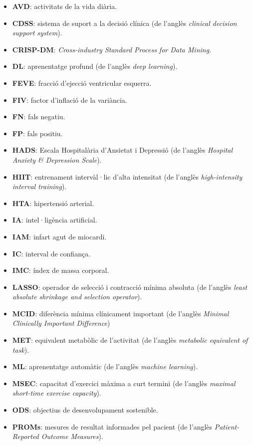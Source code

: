 \documentclass[CAT]{TFUOC}%
\providecommand{\tightlist}{\setlength{\itemsep}{0pt}\setlength{\parskip}{0pt}}
\begin{document}
\begin{itemize}
\tightlist
\item
  \textbf{AVD}: activitats de la vida diària.
\item
  \textbf{CDSS}: sistema de suport a la decisió clínica (de l'anglès \emph{clinical decision support system}).
\item
  \textbf{CRISP-DM}: \emph{Cross-industry Standard Process for Data Mining}.
\item
  \textbf{DL}: aprenentatge profund (de l'anglès \emph{deep learning}).
\item
  \textbf{FEVE}: fracció d'ejecció ventricular esquerra.
\item
  \textbf{FIV}: factor d'inflació de la variància.
\item
  \textbf{FN}: fals negatiu.
\item
  \textbf{FP}: fals positiu.
\item
  \textbf{HADS}: Escala Hospitalària d'Ansietat i Depressió (de l'anglès \emph{Hospital Anxiety \& Depression Scale}).
\item
  \textbf{HIIT}: entrenament intervàl·lic d'alta intensitat (de l'anglès \emph{high-intensity interval training}).
\item
  \textbf{HTA}: hipertensió arterial.
\item
  \textbf{IA}: intel·ligència artificial.
\item
  \textbf{IAM}: infart agut de miocardi.
\item
  \textbf{IC}: interval de confiança.
\item
  \textbf{IMC}: índex de massa corporal.
\item
  \textbf{LASSO}: operador de selecció i contracció mínima absoluta (de l'anglès \emph{least absolute shrinkage and selection operator}).
\item
  \textbf{MCID}: diferència mínima clínicament important (de l'anglès \emph{Minimal Clinically Important Difference})
\item
  \textbf{MET}: equivalent metabòlic de l'activitat (de l'anglès \emph{metabolic equivalent of task}).
\item
  \textbf{ML}: aprenentatge automàtic (de l'anglès \emph{machine learning}).
\item
  \textbf{MSEC}: capacitat d'exercici màxima a curt termini (de l'anglès \emph{maximal short-time exercise capacity}).
\item
  \textbf{ODS}: objectius de desenvolupament sostenible.
\item
  \textbf{PROMs}: mesures de resultat informades pel pacient (de l'anglès \emph{Patient-Reported Outcome Measures}).

\end{itemize}
\end{document}
